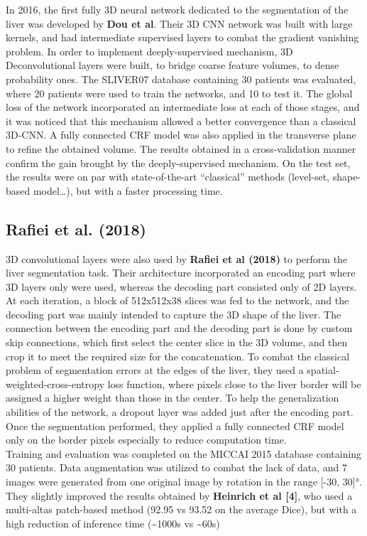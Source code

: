 In 2016, the first fully 3D neural network dedicated to the segmentation
of the liver was developed by \textbf{Dou et al}. Their 3D CNN network
was built with large kernels, and had intermediate supervised layers to
combat the gradient vanishing problem. In order to implement
deeply-supervised mechanism, 3D Deconvolutional layers were built, to
bridge coarse feature volumes, to dense probability ones. The SLIVER07
database containing 30 patients was evaluated, where 20 patients were
used to train the networks, and 10 to test it. The global loss of the
network incorporated an intermediate loss at each of those stages, and
it was noticed that this mechanism allowed a better convergence than a
classical 3D-CNN. A fully connected CRF model was also applied in the
transverse plane to refine the obtained volume. The results obtained in
a cross-validation manner confirm the gain brought by the
deeply-supervised mechanism. On the test set, the results were on par
with state-of-the-art ``classical'' methods (level-set, shape-based
model\ldots{}), but with a faster processing time.

\subsection{Rafiei et al. (2018)}\label{rafiei-et-al.-2018}

3D convolutional layers were also used by \textbf{Rafiei et al (2018)}
to perform the liver segmentation task. Their architecture incorporated
an encoding part where 3D layers only were used, whereas the decoding
part consisted only of 2D layers. At each iteration, a block of
512x512x38 slices was fed to the network, and the decoding part was
mainly intended to capture the 3D shape of the liver. The connection
between the encoding part and the decoding part is done by custom skip
connections, which first select the center slice in the 3D volume, and
then crop it to meet the required size for the concatenation. To combat
the classical problem of segmentation errors at the edges of the liver,
they used a spatial-weighted-cross-entropy loss function, where pixels
close to the liver border will be assigned a higher weight than those in
the center. To help the generalization abilities of the network, a
dropout layer was added just after the encoding part. Once the
segmentation performed, they applied a fully connected CRF model only on
the border pixels especially to reduce computation time.\\
Training and evaluation was completed on the MICCAI 2015 database
containing 30 patients. Data augmentation was utilized to combat the
lack of data, and 7 images were generated from one original image by
rotation in the range {[}-30, 30{]}°.\\
They slightly improved the results obtained by \textbf{Heinrich et al
{[}4{]}}, who used a multi-altas patch-based method (92.95 vs 93.52 on
the average Dice), but with a high reduction of inference time
(\textasciitilde{}1000s vs \textasciitilde{}60s)

